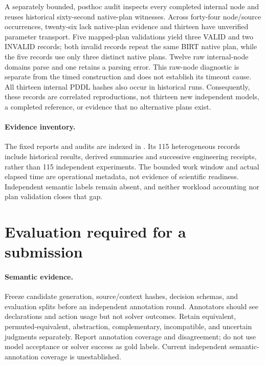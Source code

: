 \documentclass[letterpaper]{article}
\begin{document}
A separately bounded, posthoc audit inspects every completed internal node and reuses historical sixty-second native-plan witnesses. Across forty-four node/source occurrences, twenty-six lack native-plan evidence and thirteen have unverified parameter transport. Five mapped-plan validations yield three VALID and two INVALID records; both invalid records repeat the same BIRT native plan, while the five records use only three distinct native plans. Twelve raw internal-node domains parse and one retains a parsing error. This raw-node diagnostic is separate from the timed construction and does not establish its timeout cause. All thirteen internal PDDL hashes also occur in historical runs. Consequently, these records are correlated reproductions, not thirteen new independent models, a completed reference, or evidence that no alternative plans exist.


\paragraph{Evidence inventory.}
The fixed reports and audits are indexed in . Its 115 heterogeneous records include historical results, derived summaries and successive engineering receipts, rather than 115 independent experiments. The bounded work window and actual elapsed time are operational metadata, not evidence of scientific readiness. Independent semantic labels remain absent, and neither workload accounting nor plan validation closes that gap.

\section{Evaluation required for a submission}
\paragraph{Semantic evidence.}
Freeze candidate generation, source/context hashes, decision schemas, and evaluation splits before an independent annotation round. Annotators should see declarations and action usage but not solver outcomes. Retain equivalent, permuted-equivalent, abstraction, complementary, incompatible, and uncertain judgments separately. Report annotation coverage and disagreement; do not use model acceptance or solver success as gold labels. Current independent semantic-annotation coverage is unestablished.
\end{document}
